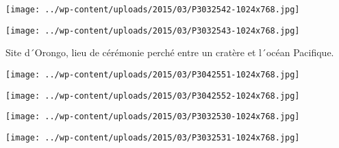 \centerline{\texttt{[image: ../wp-content/uploads/2015/03/P3032542-1024x768.jpg]} } 
 \newline
\centerline{\texttt{[image: ../wp-content/uploads/2015/03/P3032543-1024x768.jpg]} } 
 \newline
 Site d´Orongo, lieu de cérémonie perché entre un cratère et l´océan Pacifique. \newline
 \newline
\centerline{\texttt{[image: ../wp-content/uploads/2015/03/P3042551-1024x768.jpg]} } 
 \newline
\centerline{\texttt{[image: ../wp-content/uploads/2015/03/P3042552-1024x768.jpg]} } 
 \newline
 \newline
\centerline{\texttt{[image: ../wp-content/uploads/2015/03/P3032530-1024x768.jpg]} } 
 \newline
\centerline{\texttt{[image: ../wp-content/uploads/2015/03/P3032531-1024x768.jpg]} } 
 \newline
  \newline
  \newline
  \newline
  \newline
  \newline
  \newline
  \newline

\newpage
 
